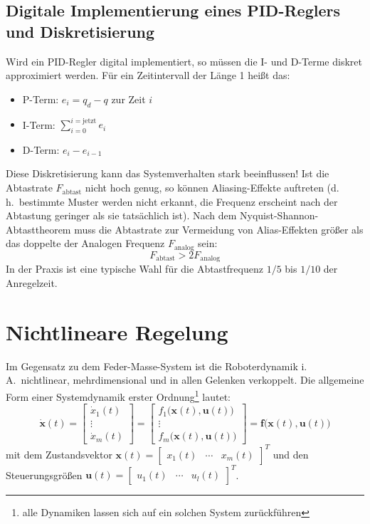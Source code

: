 \documentclass[a4paper, 11pt, accentcolor = tud3b]{tudreport}
\renewcommand{\vec}[1]{\boldsymbol{\mathbf{#1}}}
\renewcommand{\dh}{d.\,h.~}
\newcommand{\iA}{i.\,A.~}
\begin{document}
			\subsection{Digitale Implementierung eines PID-Reglers und Diskretisierung}
				Wird ein PID-Regler digital implementiert, so müssen die I- und D-Terme diskret approximiert werden. Für ein Zeitintervall der Länge \num{1} heißt das:
				\begin{itemize}
					\item P-Term: \tabto{2cm} \( e_i = q_d - q \) zur Zeit \(i\)
					\item I-Term: \tabto{2cm} \( \sum_{i = 0}^{i = \text{jetzt}} e_i \)
					\item D-Term: \tabto{2cm} \( e_i - e_{i - 1} \)
				\end{itemize}
				Diese Diskretisierung kann das Systemverhalten stark beeinflussen! Ist die Abtastrate \( F_\text{abtast} \) nicht hoch genug, so können Aliasing-Effekte auftreten (\dh bestimmte Muster werden nicht erkannt, die Frequenz erscheint nach der Abtastung geringer als sie tatsächlich ist). Nach dem Nyquist-Shannon-Abtasttheorem muss die Abtastrate zur Vermeidung von Alias-Effekten größer als das doppelte der Analogen Frequenz \( F_\text{analog} \) sein:
				\begin{equation*}
					F_\text{abtast} > 2 F_\text{analog}
				\end{equation*}
				In der Praxis ist eine typische Wahl für die Abtastfrequenz \( 1/5 \) bis \( 1/10 \) der Anregelzeit.

		\section{Nichtlineare Regelung}
			Im Gegensatz zu dem Feder-Masse-System ist die Roboterdynamik \iA nichtlinear, mehrdimensional und in allen Gelenken verkoppelt. Die allgemeine Form einer Systemdynamik erster Ordnung\footnote{alle Dynamiken lassen sich auf ein solchen System zurückführen} lautet:
			\begin{equation*}
				\dot{\vec{x}}(t) =
					\begin{bmatrix}
						\dot{x}_1(t) \\
						\vdots \\
						\dot{x}_m(t)
					\end{bmatrix}
				=
					\begin{bmatrix}
						f_1\big(\vec{x}(t), \vec{u}(t)\big) \\
						\vdots \\
						f_m\big(\vec{x}(t), \vec{u}(t)\big)
					\end{bmatrix}
				= \vec{f}\big(\vec{x}(t), \vec{u}(t)\big)
			\end{equation*}
			mit dem Zustandsvektor \( \vec{x}(t) = \begin{bmatrix} x_1(t) & \cdots & x_m(t) \end{bmatrix}^T \) und den Steuerungsgrößen \( \vec{u}(t) = \begin{bmatrix} u_1(t) & \cdots & u_l(t) \end{bmatrix}^T \).
			
\end{document}
